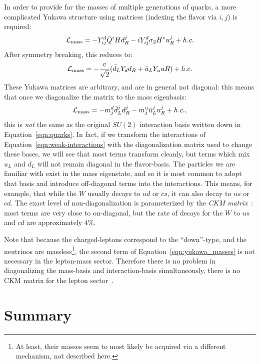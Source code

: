In order to provide for the masses of multiple generations of quarks, a more complicated Yukawa structure using matrices (indexing the flavor via $i,j$) is required:
%
\begin{equation}
\label{eqn:yukawa_masses}
\mathcal{L}_\mathrm{mass} = -Y_{ij}^d \bar{Q}^i H d_R^j - i Y_{ij}^d \sigma_2 H^* u_R^j + h.c.
\end{equation}
%
After symmetry breaking, this reduces to:
%
\begin{equation}
\mathcal{L}_\mathrm{mass} = - \frac{v}{\sqrt{2}} (\bar{d}_L Y_d d_R + \bar{u}_L Y_u uR) + h.c.
\end{equation}
%
These Yukawa matrices are arbitrary, and are in general not diagonal: this means that once we diagonalize the matrix to the mass eigenbasis:
%
\begin{equation}
\mathcal{L}_\mathrm{mass} = - m_j^d \bar{d}^j_L d^j_R - m_j^u \bar{u}_L^j u^j_R + h.c.,
\end{equation}
%
this is \textit{not} the same as the original $SU(2)$ interaction basis written down in Equation~\ref{eqn:quarks}. In fact, if we transform the interactions of Equation~\ref{eqn:weak-interactions} with the diagonalization matrix used to change these bases, we will see that most terms transform cleanly, but terms which mix $u_L$ and $d_L$ will not remain diagonal in the flavor-basis. The particles we are familiar with exist in the mass eigenstate, and so it is most common to adopt that basis and introduce off-diagonal terms into the interactions. This means, for example, that while the $W$ usually decays to $ud$ or $cs$, it can also decay to $us$ or $cd$. The exact level of non-diagonalization is parameterized by the \textit{CKM matrix}~\cite{PhysRevLett.10.531,Kobayashi01021973}: most terms are very close to on-diagonal, but the rate of decays for the $W$ to $us$ and $cd$ are approximately $4\%$.

Note that because the charged-leptons correspond to the ``down''-type, and the neutrinos are massless\footnote{At least, their masses seem to most likely be acquired via a different mechanism, not described here.}, the second term of Equation~\ref{eqn:yukawa_masses} is not necessary in the lepton-mass sector. Therefore there is no problem in diagonalizing the mass-basis and interaction-basis simultaneously, there is no CKM matrix for the lepton sector~\cite{schwartz}.


\section{Summary}

